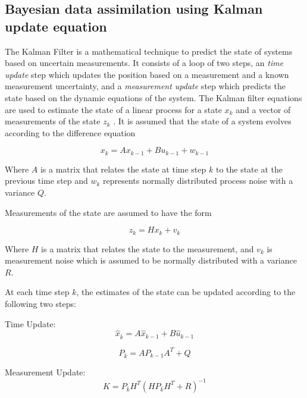 \subsection{Bayesian data assimilation using Kalman update equation}\label{subsec:Kalman-update}

The Kalman Filter is a mathematical technique to predict the state of systems based on uncertain measurements. It consists of a loop of two steps, an \emph{time update} step which updates the position based on a measurement and a known measurement uncertainty, and a \emph{measurement update} step which predicts the state based on the dynamic equations of the system. The Kalman filter equations are used to estimate the state of a linear process for a state $x_k$ and a vector of measurements of the state $z_k$ \parencite{Welch2021a}.  It is assumed that the state of a system evolves according to the difference equation

\begin{equation}
 x_k = Ax_{k-1} + Bu_{k-1} + w_{k-1}   
\end{equation}

Where $A$ is a matrix that relates the state at time step $k$ to the state at the previous time step and $w_k$ represents normally distributed process noise with a variance $Q$.  

Measurements of the state are assumed to have the form

\begin{equation}
    z_k = Hx_k + v_k
\end{equation}

Where $H$ is a matrix that relates the state to the measurement, and  $v_k$ is measurement noise which is assumed to be normally distributed with a variance $R$.

At each time step $k$, the estimates of the state can be updated according to the following two steps:

Time Update:
\begin{equation}\label{eq:timeup1}
    \hat{x}_{\bar{k}} = A\hat{x}_{k-1} + B\hat{u}_{k-1}
\end{equation}

\begin{equation}\label{eq:timeup2}
    P_{\bar{k}} = A P_{k-1} A^T + Q
\end{equation}

Measurement Update:
\begin{equation}\label{eq:kalmangain}
    K = P_{\bar{k}} H^T(H P_{\bar{k}} H^T + R) ^{-1}
\end{equation}

